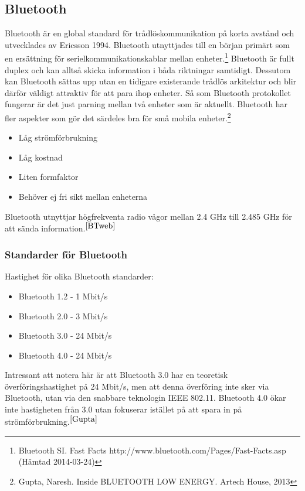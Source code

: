 \documentclass[a4paper,12pt,fleqn]{article}
\begin{document}
\subsection{Bluetooth}

Bluetooth är en global standard för trådlöskommunikation på korta avstånd och utvecklades av Ericsson 1994. Bluetooth utnyttjades till en början primärt som en ersättning för serielkommunikationskablar mellan enheter.\footnote{\label{BTweb}Bluetooth SI. Fast Facts http://www.bluetooth.com/Pages/Fast-Facts.asp (Hämtad 2014-03-24)}
Bluetooth är fullt duplex och kan alltså skicka information i båda riktningar samtidigt. Dessutom kan Bluetooth sättas upp utan en tidigare existerande trådlös arkitektur och blir därför väldigt attraktiv för att para ihop enheter. Så som Bluetooth protokollet fungerar är det just parning mellan två enheter som är aktuellt. Bluetooth har fler aspekter som gör det särdeles bra för små mobila enheter.\footnote{\label{Gupta}Gupta, Naresh. Inside BLUETOOTH LOW ENERGY. Artech House, 2013}
\begin{itemize}
\item Låg strömförbrukning 
\item Låg kostnad
\item Liten formfaktor
\item Behöver ej fri sikt mellan enheterna
\end{itemize}

Bluetooth utnyttjar högfrekventa radio vågor mellan 2.4 GHz till 2.485 GHz för att sända information.$^{\ref{BTweb}}$

\subsubsection{Standarder för Bluetooth}
Hastighet för olika Bluetooth standarder:
\begin{itemize}
\item Bluetooth 1.2 - 1 Mbit/s 
\item Bluetooth 2.0 - 3 Mbit/s
\item Bluetooth 3.0 - 24 Mbit/s
\item Bluetooth 4.0 - 24 Mbit/s
\end{itemize}

Intressant att notera här är att Bluetooth 3.0 har en teoretisk överföringshastighet på 24 Mbit/s, men att denna överföring inte sker via Bluetooth, utan via den snabbare teknologin IEEE 802.11. 
Bluetooth 4.0 ökar inte hastigheten från 3.0 utan fokuserar istället på att spara in på strömförbrukning.$^{\ref{Gupta}}$
\end{document}
